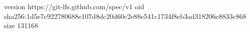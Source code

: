 version https://git-lfs.github.com/spec/v1
oid sha256:1d5e7c922780688e107d8dc20d60c2e88e541c1734f8eb3ad318206e8833c868
size 131168
